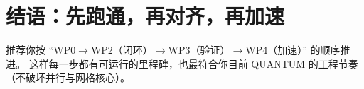 \documentclass[UTF8,a4paper,12pt]{ctexart}
\newcommand{\QUANTUM}{\textsc{QUANTUM}}
\begin{document}
\section{结语：先跑通，再对齐，再加速}
推荐你按 ``WP0$\rightarrow$WP2（闭环）$\rightarrow$WP3（验证）$\rightarrow$WP4（加速）'' 的顺序推进。
这样每一步都有可运行的里程碑，也最符合你目前 \QUANTUM{} 的工程节奏（不破坏并行与网格核心）。
\end{document}
